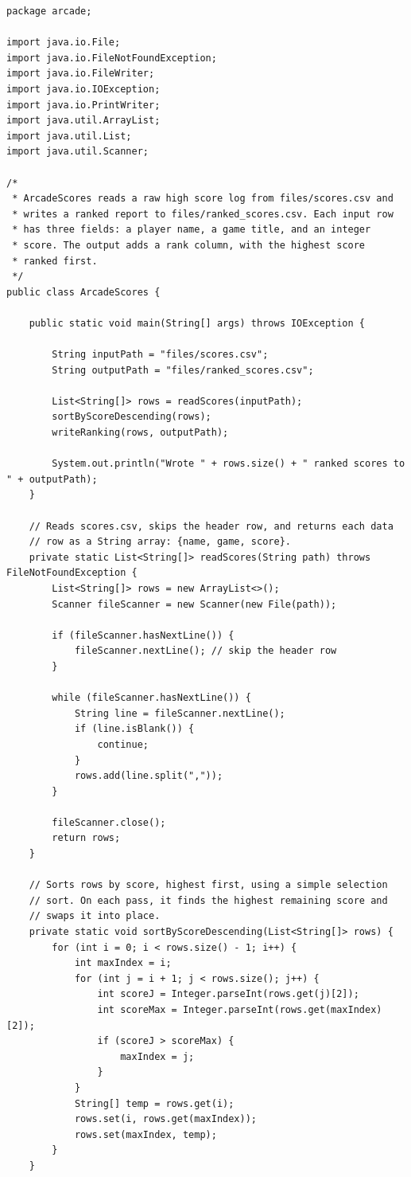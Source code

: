 \documentclass[11pt]{article}
\begin{document}
\begin{lstlisting}
package arcade;

import java.io.File;
import java.io.FileNotFoundException;
import java.io.FileWriter;
import java.io.IOException;
import java.io.PrintWriter;
import java.util.ArrayList;
import java.util.List;
import java.util.Scanner;

/*
 * ArcadeScores reads a raw high score log from files/scores.csv and
 * writes a ranked report to files/ranked_scores.csv. Each input row
 * has three fields: a player name, a game title, and an integer
 * score. The output adds a rank column, with the highest score
 * ranked first.
 */
public class ArcadeScores {

    public static void main(String[] args) throws IOException {

        String inputPath = "files/scores.csv";
        String outputPath = "files/ranked_scores.csv";

        List<String[]> rows = readScores(inputPath);
        sortByScoreDescending(rows);
        writeRanking(rows, outputPath);

        System.out.println("Wrote " + rows.size() + " ranked scores to " + outputPath);
    }

    // Reads scores.csv, skips the header row, and returns each data
    // row as a String array: {name, game, score}.
    private static List<String[]> readScores(String path) throws FileNotFoundException {
        List<String[]> rows = new ArrayList<>();
        Scanner fileScanner = new Scanner(new File(path));

        if (fileScanner.hasNextLine()) {
            fileScanner.nextLine(); // skip the header row
        }

        while (fileScanner.hasNextLine()) {
            String line = fileScanner.nextLine();
            if (line.isBlank()) {
                continue;
            }
            rows.add(line.split(","));
        }

        fileScanner.close();
        return rows;
    }

    // Sorts rows by score, highest first, using a simple selection
    // sort. On each pass, it finds the highest remaining score and
    // swaps it into place.
    private static void sortByScoreDescending(List<String[]> rows) {
        for (int i = 0; i < rows.size() - 1; i++) {
            int maxIndex = i;
            for (int j = i + 1; j < rows.size(); j++) {
                int scoreJ = Integer.parseInt(rows.get(j)[2]);
                int scoreMax = Integer.parseInt(rows.get(maxIndex)[2]);
                if (scoreJ > scoreMax) {
                    maxIndex = j;
                }
            }
            String[] temp = rows.get(i);
            rows.set(i, rows.get(maxIndex));
            rows.set(maxIndex, temp);
        }
    }


\end{lstlisting}
\end{document}
